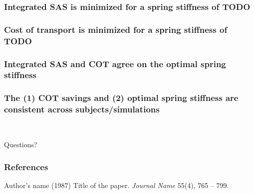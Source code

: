 \documentclass[
]{beamer}
\begin{document}
\begin{frame}
    \begin{comment}
    Integrated sum of activations squared versus spring stiffness
    \end{comment}

    \frametitle{Integrated SAS is minimized for a spring stiffness of TODO}
\end{frame}

\begin{frame}
    \begin{comment}
    Cost of transport versus spring stiffness
    \end{comment}

    \frametitle{Cost of transport is minimized for a spring stiffness of TODO}

\end{frame}

\begin{frame}
    \begin{comment}
    A comparison of the SAS and COT metrics.
    \end{comment}

    \frametitle{Integrated SAS and COT agree on the optimal spring stiffness}
\end{frame}

\begin{frame}
    \begin{comment}
    The consistency of results across the subjects/simulations.
    \end{comment}

    \frametitle{The (1) COT savings and (2) optimal spring stiffness are
    consistent across subjects/simulations}
\end{frame}
 
\begin{frame}
    \begin{comment}
    TODO place in quintessential results image/figure.
    \end{comment}
    \centerline{Questions?}
\end{frame}

\begin{frame}
    \frametitle{References}
    \footnotesize{
    \begin{thebibliography}{99}
         Author's name (1987)
            \newblock Title of the paper.
            \newblock \emph{Journal Name} 55(4), 765 -- 799.
    \end{thebibliography}
    }
\end{frame}
\end{document}
